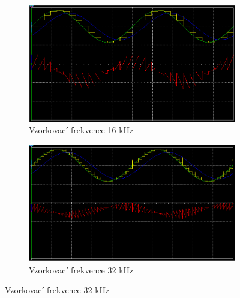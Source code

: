 \documentclass[twoside]{article}
\begin{document}
\begin{figure}[h]
    \begin{subfigure}{0.45\textwidth}
        \includegraphics[width=\textwidth]{rekonstrukce-16kHz.png}
        \caption{Vzorkovací frekvence 16 kHz}
    \end{subfigure}
    \begin{subfigure}{0.45\textwidth}
        \includegraphics[width=\textwidth]{rekonstrukce-32kHz.png}
        \caption{Vzorkovací frekvence 32 kHz}
    \end{subfigure}


\end{figure}
\end{document}
